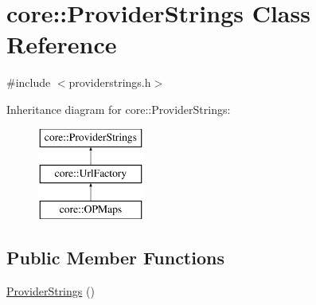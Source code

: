 \hypertarget{classcore_1_1_provider_strings}{\section{core\-:\-:Provider\-Strings Class Reference}
\label{classcore_1_1_provider_strings}
}


{\ttfamily \#include $<$providerstrings.\-h$>$}

Inheritance diagram for core\-:\-:Provider\-Strings\-:\begin{figure}[H]
\begin{center}
\leavevmode
\includegraphics[height=3.000000cm]{classcore_1_1_provider_strings}
\end{center}
\end{figure}
\subsection*{Public Member Functions}
\begin{DoxyCompactItemize}
\item 
\hyperlink{group___o_p_map_widget_ga1ecf05c742cf2e3d35cffadb55e73ba2}{Provider\-Strings} ()
\end{DoxyCompactItemize}
